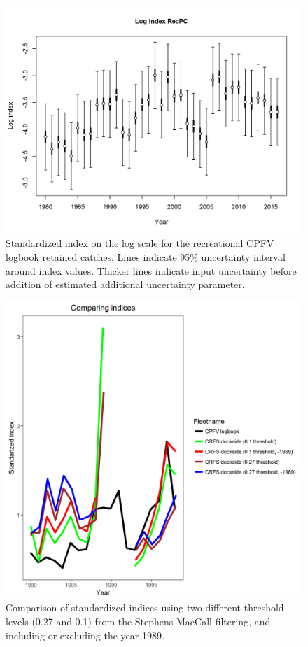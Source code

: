 \documentclass[12pt,]{article}
\begin{document}
\FloatBarrier

\FloatBarrier

\begin{figure}[htbp]
\centering
\includegraphics{r4ss/plots_mod1/index4_logcpuedata_RecPC.png}
\caption{Standardized index on the log scale for the recreational CPFV
logbook retained catches. Lines indicate 95\% uncertainty interval
around index values. Thicker lines indicate input uncertainty before
addition of estimated additional uncertainty parameter.
\label{fig:index4_logcpuedata_RecPC}}
\end{figure}

\FloatBarrier

\begin{figure}[htbp]
\centering
\includegraphics{Figures/Fleet5_RecPC_dockside_index_compare.png}
\caption{Comparison of standardized indices using two different
threshold levels (0.27 and 0.1) from the Stephens-MacCall filtering, and
including or excluding the year 1989.
\label{fig:Fleet5_RecPC_dockside_index_compare}}
\end{figure}
\end{document}
